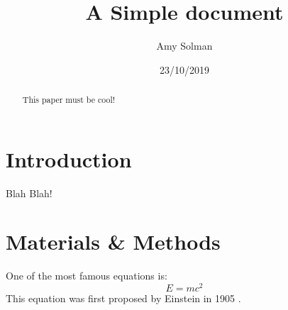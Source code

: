 \documentclass[12pt]{article}
\title{A Simple document}
\author{Amy Solman}
\date{23/10/2019}
\begin{document}
  \maketitle
  
  \begin{abstract}
    This paper must be cool!
  \end{abstract}
  
  \section{Introduction}
    Blah Blah!

  \section{Materials \& Methods}
  One of the most famous equations is:
  \begin{equation}
    E=mc^2
  \end{equation}
  This equation was first proposed by Einstein in 1905
  \cite{einstein1905does}.

  
  
\end{document}
